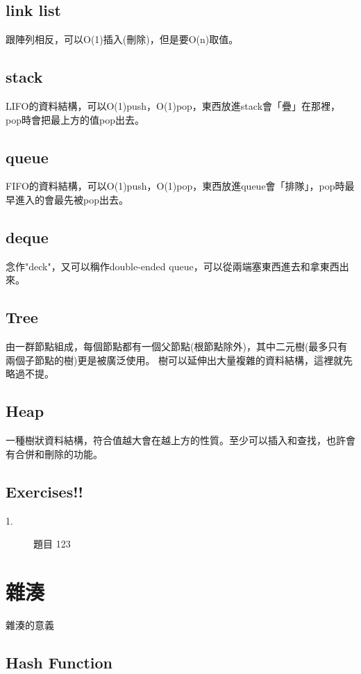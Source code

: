 \documentclass{article}
\begin{document}
\subsection{link list}
跟陣列相反，可以O(1)插入(刪除)，但是要O(n)取值。

\subsection{stack}
LIFO的資料結構，可以O(1)push，O(1)pop，東西放進stack會「疊」在那裡，pop時會把最上方的值pop出去。

\subsection{queue}
FIFO的資料結構，可以O(1)push，O(1)pop，東西放進queue會「排隊」，pop時最早進入的會最先被pop出去。

\subsection{deque}
念作"deck"，又可以稱作double-ended queue，可以從兩端塞東西進去和拿東西出來。

\subsection{Tree}
由一群節點組成，每個節點都有一個父節點(根節點除外)，其中二元樹(最多只有兩個子節點的樹)更是被廣泛使用。
樹可以延伸出大量複雜的資料結構，這裡就先略過不提。

\subsection{Heap}
一種樹狀資料結構，符合值越大會在越上方的性質。至少可以插入和查找，也許會有合併和刪除的功能。

\subsection{Exercises!!}
\begin{description}
\item[ 1.]題目
123
\end{description}


\section{雜湊}
雜湊的意義

\subsection{Hash Function}
\end{document}
